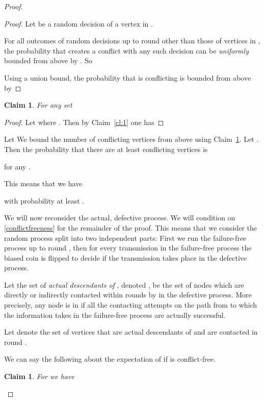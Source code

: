 \documentclass[12pt]{article}
\newtheorem{claim}[theorem]{Claim}
\newcommand{\clref}[1]{Claim~\ref{cl:#1}}
\begin{document}
{\begin{proof}
\begin{proof}
Let  be a random decision of a vertex in .

 For all outcomes of random decisions up to round  other than those of vertices in , the probability that  creates a conflict with any such decision can be \emph{uniformly} bounded from above by . So 


Using a union bound, the probability that  is conflicting is bounded from above by
 
\end{proof}


\begin{claim}\label{cl:2}
For any set 

\end{claim}

\begin{proof}
Let  where . Then by \clref{1} one has


\end{proof}

Let 
We bound the number of conflicting vertices from above using \clref{2}.
Let . Then the probability that there are at least  conflicting vertices is


for any .

This means that we have

with probability at least .

We will now reconsider the actual, defective process. We will condition on \eqref{conflictfreeness} for the remainder of the proof. This means that we consider the random process split into two independent parts: First we run the failure-free process up to round , then for every transmission in the failure-free process the biased coin is flipped to decide if the transmission takes place in the defective process.

Let the set of 
\emph{actual descendants of} , denoted , be the set of nodes which are directly or indirectly contacted within rounds  by  in the defective process. More precisely, any node  is in 
if all the contacting attempts on the path from  to  which the information
takes in the failure-free process are actually successful.

Let  denote the set of vertices that are actual descendants of  and are contacted in round . 

We can say the following about the expectation of  if  is conflict-free.
\begin{claim}
For  we have

\end{claim}


\end{proof}}
\end{document}
